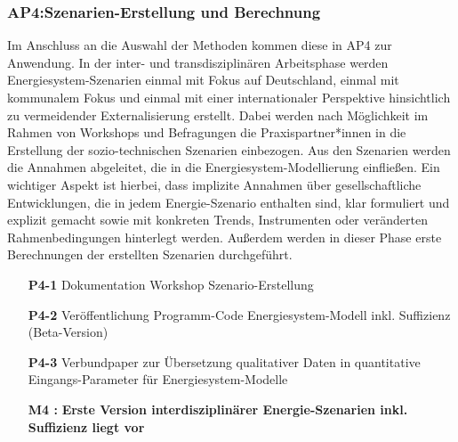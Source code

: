 \documentclass[a4paper,11pt,twoside]{scrartcl}
\begin{document}
\subsubsection*{AP4:Szenarien-Erstellung und Berechnung}
Im Anschluss an die Auswahl der Methoden kommen diese in AP4 zur Anwendung. In der inter- und transdisziplinären Arbeitsphase werden Energiesystem-Szenarien einmal mit Fokus auf Deutschland, einmal mit kommunalem Fokus und einmal mit einer internationaler Perspektive hinsichtlich zu vermeidender Externalisierung erstellt. Dabei werden nach Möglichkeit im Rahmen von Workshops und Befragungen die Praxispartner*innen in die Erstellung der sozio-technischen Szenarien einbezogen. Aus den Szenarien werden die Annahmen abgeleitet, die in die Energiesystem-Modellierung einfließen. Ein wichtiger Aspekt ist hierbei, dass implizite Annahmen über gesellschaftliche Entwicklungen, die in jedem Energie-Szenario enthalten sind, klar formuliert und explizit gemacht sowie mit konkreten Trends, Instrumenten oder veränderten Rahmenbedingungen hinterlegt werden. Außerdem werden in dieser Phase erste Berechnungen der erstellten Szenarien durchgeführt.

\begin{itemize}
    \item[\textbf{P4-1}] Dokumentation Workshop Szenario-Erstellung
    \item[\textbf{P4-2}] Veröffentlichung Programm-Code Energiesystem-Modell inkl. Suffizienz (Beta-Version)
    \item[\textbf{P4-3}] Verbundpaper zur Übersetzung qualitativer Daten in quantitative Eingangs-Parameter für Energiesystem-Modelle
    \item[\textbf{M4 :}] \textbf{Erste Version interdisziplinärer Energie-Szenarien inkl. Suffizienz liegt vor}
\end{itemize}
\end{document}
